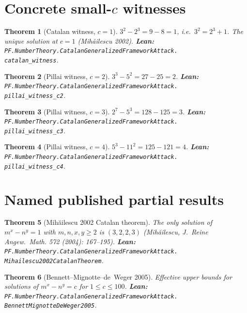 \documentclass[11pt,a4paper]{article}
\theoremstyle{plain}
\newtheorem{theorem}{Theorem}[section]
\theoremstyle{definition}
\begin{document}
\section{Concrete small-$c$ witnesses}

\begin{theorem}[Catalan witness, $c = 1$]
\label{thm:catalan-witness}
$3^{2} - 2^{3} = 9 - 8 = 1$, i.e.\ $3^{2} = 2^{3} + 1$.
The unique solution at $c = 1$ (Mih\u{a}ilescu 2002).
\textbf{Lean:}
\texttt{PF.NumberTheory.CatalanGeneralizedFrameworkAttack.\\
catalan\_witness}.
\end{theorem}

\begin{theorem}[Pillai witness, $c = 2$]
\label{thm:pillai-c2}
$3^{3} - 5^{2} = 27 - 25 = 2$.
\textbf{Lean:}
\texttt{PF.NumberTheory.CatalanGeneralizedFrameworkAttack.\\
pillai\_witness\_c2}.
\end{theorem}

\begin{theorem}[Pillai witness, $c = 3$]
\label{thm:pillai-c3}
$2^{7} - 5^{3} = 128 - 125 = 3$.
\textbf{Lean:}
\texttt{PF.NumberTheory.CatalanGeneralizedFrameworkAttack.\\
pillai\_witness\_c3}.
\end{theorem}

\begin{theorem}[Pillai witness, $c = 4$]
\label{thm:pillai-c4}
$5^{3} - 11^{2} = 125 - 121 = 4$.
\textbf{Lean:}
\texttt{PF.NumberTheory.CatalanGeneralizedFrameworkAttack.\\
pillai\_witness\_c4}.
\end{theorem}

\section{Named published partial results}

\begin{theorem}[Mih\u{a}ilescu 2002 Catalan theorem]
\label{thm:mihailescu}
The only solution of $m^{x} - n^{y} = 1$ with $m, n, x, y \ge 2$
is $(3, 2, 2, 3)$ (Mih\u{a}ilescu, \emph{J.~Reine Angew.~Math.}
572 (2004): 167--195).
\textbf{Lean:}
\texttt{PF.NumberTheory.CatalanGeneralizedFrameworkAttack.\\
Mihailescu2002CatalanTheorem}.
\end{theorem}

\begin{theorem}[Bennett--Mignotte--de~Weger 2005]
\label{thm:bmw}
Effective upper bounds for solutions of $m^{x} - n^{y} = c$ for
$1 \le c \le 100$.
\textbf{Lean:}
\texttt{PF.NumberTheory.CatalanGeneralizedFrameworkAttack.\\
BennettMignotteDeWeger2005}.
\end{theorem}
\end{document}
